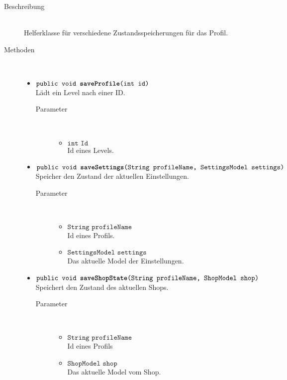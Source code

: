\begin{description}
\item[Beschreibung] \hfill \\ Helferklasse für verschiedene Zustandsspeicherungen für das Profil.

\item[Methoden] \hfill \\
	\vspace{-.8cm}
	\begin{itemize}
		\item $\texttt{public void \textbf{saveProfile}(int id)}$ \\ Lädt ein Level nach einer ID.
		\begin{description}
			\item[Parameter] \hfill \\
			\vspace{-.8cm}
			\begin{itemize}
				\item $\texttt{int Id}$ \\ Id eines Levels.
			\end{itemize}
		\end{description}
		
		\item $\texttt{public void \textbf{saveSettings}(String profileName, SettingsModel settings)}$ \\ Speicher den Zustand der aktuellen Einstellungen.
				\begin{description}
			\item[Parameter] \hfill \\
			\vspace{-.8cm}
			\begin{itemize}
				\item $\texttt{String profileName}$ \\ Id eines Profils.
				\item $\texttt{SettingsModel settings}$ \\ Das aktuelle Model der Einstellungen.
			\end{itemize}
		\end{description}
		
		\item $\texttt{public void \textbf{saveShopState}(String profileName, ShopModel shop)}$ \\ Speichert den Zustand des aktuellen Shops.
		\begin{description}
			\item[Parameter] \hfill \\
			\vspace{-.8cm}
			\begin{itemize}
				\item $\texttt{String profileName}$ \\ Id eines Profils
			\item $\texttt{ShopModel shop}$ \\ Das aktuelle Model vom Shop.
		\end{itemize}
		\end{description}
	\end{itemize}
\end{description}
		
